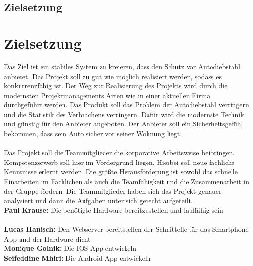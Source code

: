 \section{Zielsetzung}
\chapter{Zielsetzung}
Das Ziel ist ein stabiles System zu kreieren, dass den Schutz vor Autodiebstahl anbietet. Das Projekt soll zu gut wie möglich realisiert werden, sodass es konkurrenzfähig ist. 
Der Weg zur Realisierung des Projekts wird durch die modernsten Projektmanagements Arten wie in einer aktuellen Firma durchgeführt werden. 
Das Produkt soll das Problem der Autodiebstahl verringern und die Statistik des Verbrachens verringern. Dafür wird die modernste Technik und günstig für den Anbieter angeboten.
 Der Anbieter soll ein Sicherheitsgefühl bekommen, dass sein Auto sicher vor seiner Wohnung liegt.\\\\
Das Projekt soll die Teammitglieder die korporative Arbeitsweise beibringen. 
Kompetenzerwerb soll hier im Vordergrund liegen. Hierbei soll neue fachliche Kenntnisse erlernt werden.
Die größte Herausforderung ist sowohl das schnelle Einarbeiten im Fachlichen als auch die Teamfähigkeit und die Zusammenarbeit in der Gruppe fördern.
Die Teammitglieder haben sich das Projekt genauer analysiert und dann die Aufgaben unter sich gerecht aufgeteilt.\\
\textbf{Paul Krause:} Die benötigte Hardware bereitzustellen und lauffähig sein\\\\
\textbf{Lucas Hanisch:} Den Webserver bereitstellen der Schnittelle für das Smartphone App und der Hardware dient\\
\textbf{Monique Golnik:} Die IOS App entwickeln\\
\textbf{Seifeddine Mhiri:} Die Android App entwickeln\\